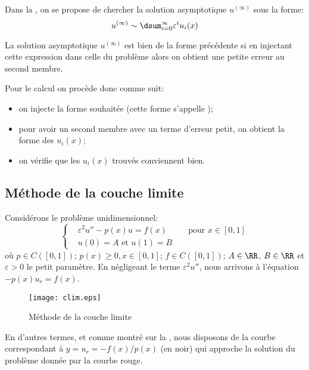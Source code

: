Dans la , on se propose de chercher la
solution asymptotique $u^{(\infty)}$ sous la forme:
\begin{equation}
u^{(\infty)} \sim \dsum_{i=0}^\infty \varepsilon^iu_i(x)
\end{equation}

\medskip
La solution asymptotique $u^{(\infty)}$ est bien de la forme précédente si en injectant
cette expression dans celle du problème alors on obtient une petite erreur au second membre.

\medskip
Pour le calcul on procède donc comme suit:
\begin{itemize}
   \item on injecte la forme souhaitée (cette forme s'appelle );
   \item pour avoir un second membre avec un terme d'erreur petit, on obtient la forme des $u_i(x)$;
   \item on vérifie que les $u_i(x)$ trouvés conviennent bien.
\end{itemize}


\medskip
\subsection{Méthode de la couche limite}
Considérons le problème unidimensionnel:
\begin{equation}
\left\{
\begin{aligned}
&\varepsilon^2u''-p(x)u= f(x) &&\text{ pour } x\in[0,1]\\
&u(0)=A \text{ et } u(1)=B
\end{aligned}
\right.
\end{equation}
où $p\in C([0,1])$; $p(x)\ge0, x\in[0,1]$; $f\in C([0,1])$; $A\in\RR$, $B\in\RR$ et
$\varepsilon>0$ le petit paramètre.
En négligeant le terme $\varepsilon^2 u''$, nous arrivons à l'équation $-p(x)u_r=f(x)$.
\begin{figure}[ht]
\centering\texttt{[image: clim.eps]}
\caption{Méthode de la couche limite}\label{Fig-clim}
\end{figure}
En d'autres termes, et comme montré sur la , nous disposons de la
courbe correspondant à $y=u_r=-f(x)/p(x)$ (en noir) qui approche la solution du problème donnée par la courbe rouge.

